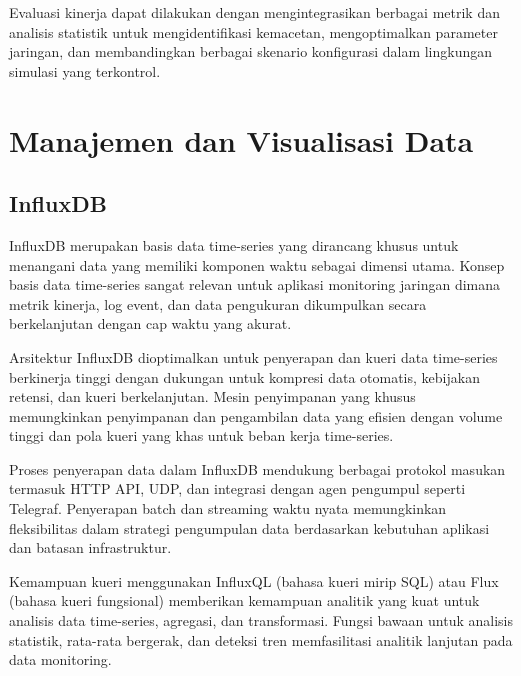 Evaluasi kinerja dapat dilakukan dengan mengintegrasikan berbagai metrik dan analisis statistik untuk mengidentifikasi kemacetan, mengoptimalkan parameter jaringan, dan membandingkan berbagai skenario konfigurasi dalam lingkungan simulasi yang terkontrol.


\section{Manajemen dan Visualisasi Data}

\subsection{InfluxDB}

InfluxDB merupakan basis data time-series yang dirancang khusus untuk menangani data yang memiliki komponen waktu sebagai dimensi utama. Konsep basis data time-series sangat relevan untuk aplikasi monitoring jaringan dimana metrik kinerja, log event, dan data pengukuran dikumpulkan secara berkelanjutan dengan cap waktu yang akurat.

Arsitektur InfluxDB dioptimalkan untuk penyerapan dan kueri data time-series berkinerja tinggi dengan dukungan untuk kompresi data otomatis, kebijakan retensi, dan kueri berkelanjutan. Mesin penyimpanan yang khusus memungkinkan penyimpanan dan pengambilan data yang efisien dengan volume tinggi dan pola kueri yang khas untuk beban kerja time-series.

Proses penyerapan data dalam InfluxDB mendukung berbagai protokol masukan termasuk HTTP API, UDP, dan integrasi dengan agen pengumpul seperti Telegraf. Penyerapan batch dan streaming waktu nyata memungkinkan fleksibilitas dalam strategi pengumpulan data berdasarkan kebutuhan aplikasi dan batasan infrastruktur.

Kemampuan kueri menggunakan InfluxQL (bahasa kueri mirip SQL) atau Flux (bahasa kueri fungsional) memberikan kemampuan analitik yang kuat untuk analisis data time-series, agregasi, dan transformasi. Fungsi bawaan untuk analisis statistik, rata-rata bergerak, dan deteksi tren memfasilitasi analitik lanjutan pada data monitoring.

